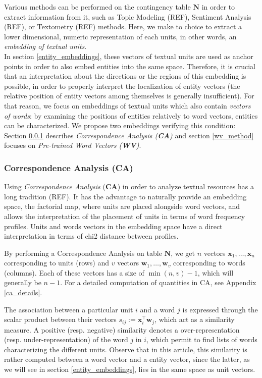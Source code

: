 \documentclass[
twocolumn,
]{ceurart}
\begin{document}
Various methods can be performed on the contingency table $\mathbf{N}$ in order to extract information from it, such as Topic Modeling (REF), Sentiment Analysis (REF), or Textometry (REF) methods. Here, we make to choice to extract a lower dimensional, numeric representation of each units, in other words, an \emph{embedding of textual units}. \\
In section \ref{entity_embeddings}, these vectors of textual units are used as anchor points in order to also embed entities into the same space. Therefore, it is crucial that an interpretation about the directions or the regions of this embedding is possible, in order to properly interpret the localization of entity vectors (the relative position of entity vectors among themselves is generally insufficient). For that reason, we focus on embeddings of textual units which also contain \emph{vectors of words}: by examining the positions of entities relatively to word vectors, entities can be characterized. We propose two embeddings verifying this condition: Section \ref{ca_method} describes \emph{Correspondence Analysis (\textbf{CA})} and section \ref{wv_method} focuses on \emph{Pre-trained Word Vectors (\textbf{WV})}. 

\subsubsection{Correspondence Analysis (CA)}
\label{ca_method}

Using \emph{Correspondence Analysis} (\textbf{CA}) in order to analyze textual resources has a long tradition (REF). It has the advantage to naturally provide an embedding space, the factorial map, where units are placed alongside word vectors, and allows the interpretation of the placement of units in terms of word frequency profiles. Units and words vectors in the embedding space have a direct interpretation in terms of chi2 distance between profiles.

By performing a Correspondence Analysis on table $\mathbf{N}$, we get $n$ vectors $\mathbf{x}_1, \ldots, \mathbf{x}_n$ corresponding to units (rows) and $v$ vectors $\mathbf{w}_1, \ldots, \mathbf{w}_v$ corresponding to words (columns). Each of these vectors has a size of $\min(n, v) - 1$, which will generally be $n - 1$. For a detailed computation of quantities in CA, see Appendix \ref{ca_details}. 

The association between a particular unit $i$ and a word $j$ is expressed through the scalar product between their vectors $s_{ij} := \mathbf{x}^\top_i \mathbf{w}_j$, which act as a similarity measure. A positive (resp. negative) similarity denotes a over-representation (resp. under-representation) of the word $j$ in $i$, which permit to find lists of words characterizing the different units. Observe that in this article, this similarity is rather computed between a word vector and a entity vector, since the latter, as we will see in section \ref{entity_embeddings}, lies in the same space as unit vectors. 
\end{document}
